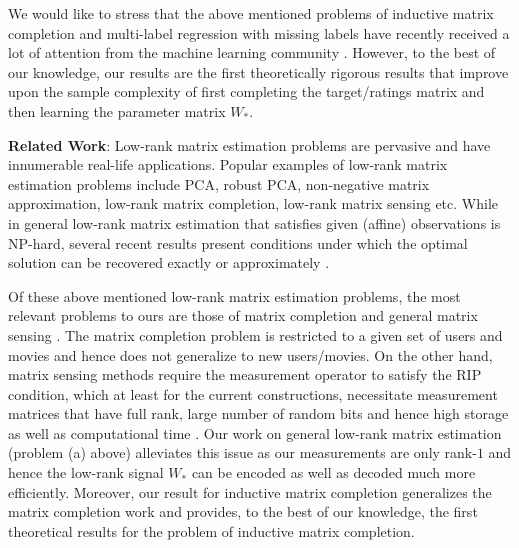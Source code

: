 \documentclass[11pt]{article}
\newcommand{\Wo}{W_*}
\begin{document}
We would like to stress that the above mentioned problems of inductive matrix completion and multi-label regression with missing labels have recently received a lot of attention from the machine learning community \cite{AbernethyBEV09, AgrawalGPV13}. However, to the best of our knowledge, our results are the first theoretically rigorous results that improve upon the sample complexity of first completing the target/ratings matrix and then learning the parameter matrix $\Wo$. 


{\bf Related Work}: Low-rank matrix estimation problems are pervasive and have innumerable real-life applications. Popular examples of low-rank matrix estimation problems include PCA, robust PCA, non-negative matrix approximation, low-rank matrix completion, low-rank matrix sensing etc. While in general low-rank matrix estimation that satisfies given (affine) observations is NP-hard, several recent results present  conditions under which the optimal solution can be recovered exactly or approximately \cite{CandesR2007, RechtFP2007, CandesT2009, AgarwalNW11, ChandrasekaranSPW2009, CandesLMW11, JainNS13, JainMD10}. 

Of these above mentioned low-rank matrix estimation problems, the most relevant problems to ours are those of matrix completion \cite{CandesR2007, KeshavanOM2009,JainNS13} and general matrix sensing \cite{RechtFP2007, JainMD10, LeeBre09}. The matrix completion problem is restricted to a given set of users and movies and hence does not generalize to new users/movies. On the other hand, matrix sensing methods require the measurement operator to satisfy the RIP condition, which at least for the current constructions, necessitate measurement matrices that have full rank, large number of random bits and hence high storage as well as computational time \cite{RechtFP2007}. Our work on general low-rank matrix estimation (problem (a) above) alleviates this issue as our measurements are only rank-$1$ and hence the low-rank signal $\Wo$ can be  encoded as well as decoded much more efficiently. Moreover, our result for inductive matrix completion generalizes the matrix completion work and provides,  to the best of our knowledge, the first theoretical results for the problem of inductive matrix completion. 
\end{document}
